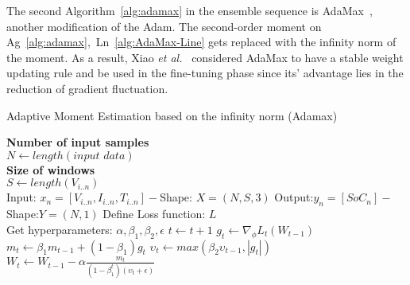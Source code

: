 %
The second \mbox{Algorithm~\ref{alg:adamax}} in the ensemble sequence is AdaMax~\cite{kingma_adam_2017}, another modification of the Adam.
The second-order moment on \mbox{Ag~\ref{alg:adamax}, Ln~\ref{alg:AdaMax-Line}} gets replaced with the infinity norm of the moment.
As a result, Xiao \textit{et al.}~\cite{xiao_accurate_2019} considered AdaMax to have a stable weight updating rule and be used in the fine-tuning phase since its' advantage lies in the reduction of gradient fluctuation. 
\begin{algorithm}
    \caption{Adaptive Moment Estimation based on the infinity norm (Adamax)}
    \begin{algorithmic}[1]
      \STATE \textbf{Number of input samples} \\ $N\gets length(\textit{input data})$\\
      \STATE \textbf{Size of windows} \\ $S\gets length(V_{i..n})$\\
      \STATE Input: $x_n = [V_{i..n}, I_{i..n}, T_{i..n}] - $Shape: $X = (N, S, 3)$
      \STATE Output:$y_n = [SoC_{n}] - $Shape:$Y = (N, 1)$
      \STATE Define Loss function: $L$ \\
             Get hyperparameters: $\alpha, \beta_1, \beta_2, \epsilon$
      \STATE $t \gets t+1$
      \STATE $g_t \gets \nabla_\phi L_t (W_{t-1})$ 
      \STATE $m_t \gets \beta_1 m_{t-1}+(1-\beta_1) g_t $ 
      \STATE $\upsilon_t \gets max\left(\beta_2\upsilon_{t-1}, |g_t|\right) $ 
      \STATE $W_t \gets W_{t-1}- \alpha \frac{m_t}{(1-\beta^t_1)(\upsilon_t+\epsilon)} $ 
      \ENDWHILE
    \end{algorithmic}
    \label{alg:adamax}
\end{algorithm}

